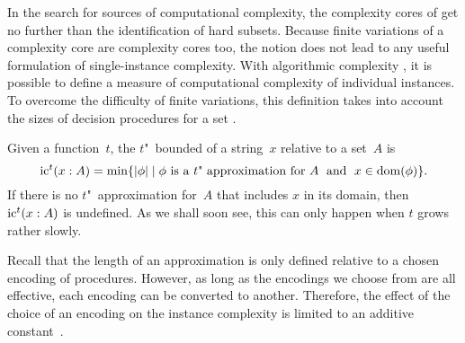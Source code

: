 \label{sec:algorithmic}%

In the search for sources of computational complexity, the complexity cores of \citeauthor{lynch1975reducibility} get no further than the identification of hard subsets.
Because finite variations of a complexity core are complexity cores too, the notion does not lead to any useful formulation of single-instance complexity.
With algorithmic complexity \parencite{li2008introduction}, it is possible to define a measure of computational complexity of individual instances.
To overcome the difficulty of finite variations, this definition takes into account the sizes of decision procedures for a set \parencite{ko1986hard,orponen1994instance}.
\begin{definition}
\label{def:ic}%
  Given a function~$t$, the $t$"~bounded  of a string~$x$ relative to a set~$A$ is
  \begin{equation*}
    \operatorname{ic}^t(x : A) = \min\{{\lvert\phi\rvert} \;|\; \text{$\phi$ is a $t$"~approximation for $A$} \;\text{ and }\; x \in \operatorname{dom}(\phi)\}.
  \end{equation*}
  If there is no $t$"~approximation for~$A$ that includes $x$ in its domain, then $\operatorname{ic}^t(x : A)$ is undefined.
  As we shall soon see, this can only happen when $t$ grows rather slowly.
\end{definition}

Recall that the length of an approximation is only defined relative to a chosen encoding of procedures.
However, as long as the encodings we choose from are all effective, each encoding can be converted to another.
Therefore, the effect of the choice of an encoding on the instance complexity is limited to an additive constant~\parencite{orponen1994instance,li2008introduction}.

